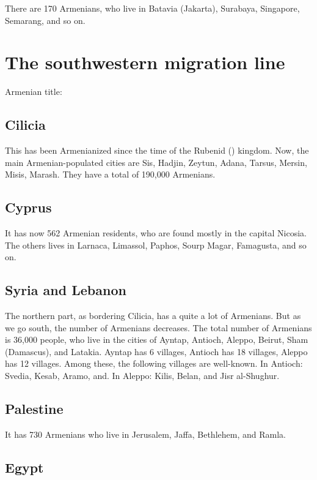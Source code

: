 There are 170 Armenians, who live in Batavia (Jakarta), Surabaya, Singapore, Semarang, and so on. 

\section{The southwestern migration line}

Armenian title: 


\subsection{Cilicia}

This has been Armenianized since the time of the Rubenid () kingdom. Now, the main Armenian-populated cities are Sis, Hadjin, Zeytun, Adana, Tarsus, Mersin, Misis, Marash. They have a total of 190,000 Armenians.

\subsection{Cyprus}

It has now 562 Armenian residents, who are found mostly in the capital Nicosia. The others lives in Larnaca, Limassol, Paphos, Sourp Magar, Famagusta, and so on. 

\subsection{Syria and Lebanon}

The northern part, as bordering Cilicia, has a quite a lot of Armenians. But as we go south, the number of Armenians decreases. The total number of Armenians is 36,000 people, who live in the cities of Ayntap, Antioch, Aleppo, Beirut, Sham (Damascus), and Latakia. Ayntap has 6 villages, Antioch has 18 villages, Aleppo has 12 villages. Among these, the following villages are well-known. In Antioch: Svedia, Kesab, Aramo, and. In Aleppo: Kilis, Belan, and Jisr al-Shughur.

\subsection{Palestine}
It has 730 Armenians who live in Jerusalem, Jaffa, Bethlehem, and Ramla. 

\subsection{Egypt}


